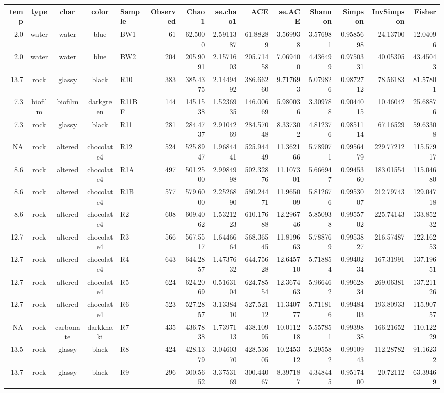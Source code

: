\documentclass[
]{book}
\begin{document}
\captionsetup[table]{labelformat=empty,skip=1pt}
\begin{longtable}{rccclrrrrrrrrr}
\toprule
temp & type & char & color & Sample & Observed & Chao1 & se.chao1 & ACE & se.ACE & Shannon & Simpson & InvSimpson & Fisher \\ 
\midrule
2.0 & water & water & blue & BW1 & 61 & 62.5000 & 2.5911387 & 61.88289 & 3.569938 & 3.576981 & 0.9585698 & 24.13700 & 12.04096 \\ 
2.0 & water & water & blue & BW2 & 204 & 205.9091 & 2.1571603 & 205.71458 & 7.069400 & 4.436499 & 0.9750331 & 40.05305 & 43.45043 \\ 
13.7 & rock & glassy & black & R10 & 383 & 385.4375 & 2.1449492 & 386.66260 & 9.717693 & 5.079826 & 0.9872712 & 78.56183 & 81.57801 \\ 
7.3 & biofilm & biofilm & darkgreen & R11BF & 144 & 145.1538 & 1.5236935 & 146.00669 & 5.980036 & 3.309788 & 0.9044015 & 10.46042 & 25.68876 \\ 
7.3 & rock & glassy & black & R11 & 281 & 284.4737 & 2.9104269 & 284.57048 & 8.337302 & 4.812376 & 0.9851114 & 67.16529 & 59.63308 \\ 
NA & rock & altered & chocolate4 & R12 & 524 & 525.8947 & 1.9684441 & 525.94449 & 11.362166 & 5.789071 & 0.9956479 & 229.77212 & 115.57917 \\ 
8.6 & rock & altered & chocolate4 & R1A & 497 & 501.2500 & 2.9984998 & 502.32876 & 11.107301 & 5.666947 & 0.9945360 & 183.01554 & 115.04680 \\ 
8.6 & rock & altered & chocolate4 & R1B & 577 & 579.6000 & 2.2526890 & 580.24471 & 11.965009 & 5.812676 & 0.9953007 & 212.79743 & 129.04718 \\ 
8.6 & rock & altered & chocolate4 & R2 & 608 & 609.4062 & 1.5321223 & 610.17688 & 12.296746 & 5.850938 & 0.9955702 & 225.74143 & 133.85232 \\ 
12.7 & rock & altered & chocolate4 & R3 & 566 & 567.5517 & 1.6446664 & 568.36545 & 11.819663 & 5.788769 & 0.9953827 & 216.57487 & 122.16253 \\ 
12.7 & rock & altered & chocolate4 & R4 & 643 & 644.2857 & 1.4737632 & 644.75628 & 12.645710 & 5.718854 & 0.9940234 & 167.31991 & 137.19651 \\ 
12.7 & rock & altered & chocolate4 & R5 & 624 & 624.2069 & 0.5163104 & 624.78554 & 12.367463 & 5.966462 & 0.9962834 & 269.06381 & 137.21126 \\ 
12.7 & rock & altered & chocolate4 & R6 & 523 & 527.2857 & 3.1338410 & 527.52112 & 11.340777 & 5.711816 & 0.9948403 & 193.80933 & 115.90757 \\ 
NA & rock & carbonate & darkkhaki & R7 & 435 & 436.7838 & 1.7397113 & 438.10995 & 10.011218 & 5.557851 & 0.9939838 & 166.21652 & 110.12229 \\ 
13.5 & rock & glassy & black & R8 & 424 & 428.1379 & 3.0460370 & 428.53605 & 10.245312 & 5.295582 & 0.9910943 & 112.28782 & 91.16232 \\ 
13.7 & rock & glassy & black & R9 & 296 & 300.5652 & 3.3753169 & 300.44067 & 8.397187 & 4.348445 & 0.9517400 & 20.72112 & 63.39469 \\ 
 \bottomrule
\end{longtable}
\end{document}
